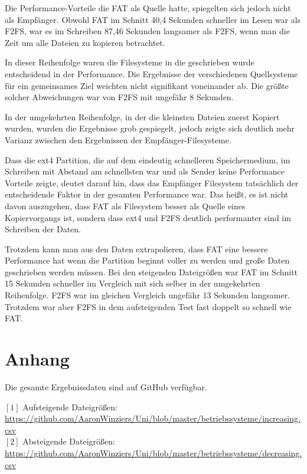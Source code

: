 \documentclass[11pt,parskip=full]{scrartcl}
\begin{document}
	Die Performance-Vorteile die FAT als Quelle hatte, spiegelten sich jedoch nicht als Empfänger. Obwohl FAT im Schnitt 40,4 Sekunden schneller im Lesen war als F2FS, war es im Schreiben 87,46 Sekunden langsamer als F2FS, wenn man die Zeit um alle Dateien zu kopieren betrachtet.
	
	In dieser Reihenfolge waren die Filesysteme in die geschrieben wurde entscheidend in der Performance. Die Ergebnisse der verschiedenen Quellsysteme für ein gemeinsames Ziel weichten nicht signifikant voneinander ab. Die größte solcher Abweichungen war von F2FS mit ungefähr 8 Sekunden.
	
	In der umgekehrten Reihenfolge, in der die kleinsten Dateien zuerst Kopiert wurden, wurden die Ergebnisse grob gespiegelt, jedoch zeigte sich deutlich mehr Varianz zwischen den Ergebnissen der Empfänger-Filesysteme.
	
	Dass die ext4 Partition, die auf dem eindeutig schnelleren Speichermedium, im Schreiben mit Abstand am schnellsten war und als Sender keine Performance Vorteile zeigte, deutet darauf hin, dass das Empfänger Filesystem tatsächlich der entscheidende Faktor in der gesamten Performance war. Das heißt, es ist nicht davon auszugehen, dass FAT als Filesystem besser als Quelle eines Kopiervorgangs ist, sondern dass ext4 und F2FS deutlich performanter sind im Schreiben der Daten.
	
	Trotzdem kann man aus den Daten extrapolieren, dass FAT eine bessere Performance hat wenn die Partition beginnt voller zu werden und große Daten geschrieben werden müssen. Bei den steigenden Dateigrößen war FAT im Schnitt 15 Sekunden schneller im Vergleich mit sich selber in der umgekehrten Reihenfolge. F2FS war im gleichen Vergleich ungefähr 13 Sekunden langsamer. Trotzdem war aber F2FS in dem aufsteigenden Test fast doppelt so schnell wie FAT.

\section{Anhang}

	Die gesamte Ergebnissdaten sind auf GitHub verfügbar.
	
	$[1]$ Aufsteigende Dateigrößen: \url{https://github.com/AaronWinziers/Uni/blob/master/betriebssysteme/increasing.csv}\\
	$[2]$ Absteigende Dateigrößen: \url{https://github.com/AaronWinziers/Uni/blob/master/betriebssysteme/decreasing.csv}
	
\end{document}
